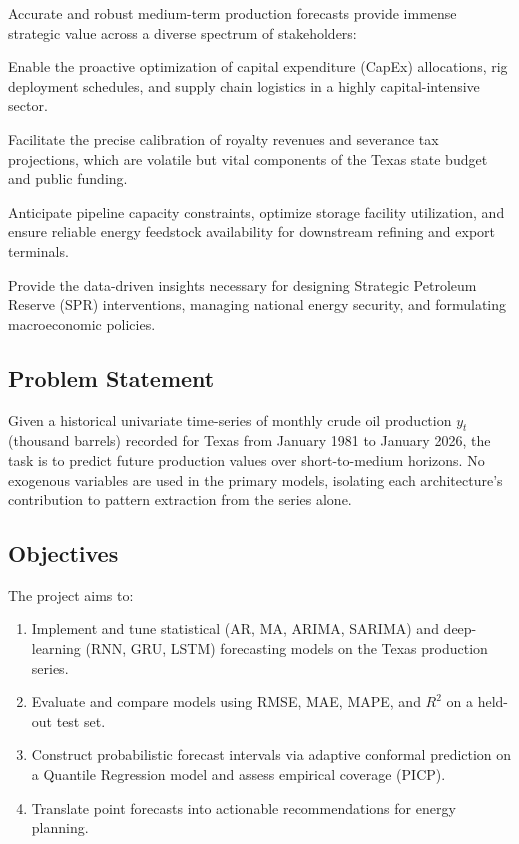 \documentclass[12pt,a4paper]{article}
\begin{document}
Accurate and robust medium-term production forecasts provide immense strategic value across a diverse spectrum of stakeholders:
\begin{description}[style=nextline]
  \item[Producers and Upstream Operators] 
  Enable the proactive optimization of capital expenditure (CapEx) allocations, rig deployment schedules, and supply chain logistics in a highly capital-intensive sector.
  \item[Regulators and State Planners] 
  Facilitate the precise calibration of royalty revenues and severance tax projections, which are volatile but vital components of the Texas state budget and public funding.
  \item[Midstream and Grid Operators] 
  Anticipate pipeline capacity constraints, optimize storage facility utilization, and ensure reliable energy feedstock availability for downstream refining and export terminals.
  \item[Policy Makers and Economists] 
  Provide the data-driven insights necessary for designing Strategic Petroleum Reserve (SPR) interventions, managing national energy security, and formulating macroeconomic policies.
\end{description}

\subsection{Problem Statement}

Given a historical univariate time-series of monthly crude oil production $y_t$ (thousand barrels) recorded for Texas from January 1981 to January 2026, the task is to predict future production values over short-to-medium horizons. No exogenous variables are used in the primary models, isolating each architecture's contribution to pattern extraction from the series alone.

\subsection{Objectives}

The project aims to:
\begin{enumerate}
  \item Implement and tune statistical (AR, MA, ARIMA, SARIMA) and deep-learning (RNN, GRU, LSTM) forecasting models on the Texas production series.
  \item Evaluate and compare models using RMSE, MAE, MAPE, and $R^2$ on a held-out test set.
  \item Construct probabilistic forecast intervals via adaptive conformal prediction on a Quantile Regression model and assess empirical coverage (PICP).
  \item Translate point forecasts into actionable recommendations for energy planning.
\end{enumerate}
\end{document}
